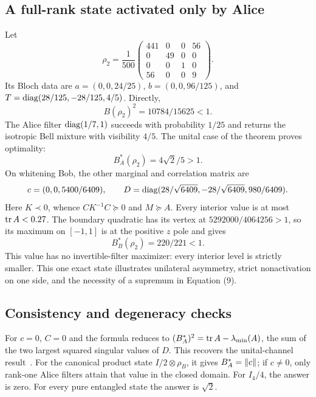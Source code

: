 \subsection{A full-rank state activated only by Alice}
Let
\begin{equation}
 \rho_2=\frac1{500}\begin{pmatrix}
 441&0&0&56\\0&49&0&0\\0&0&1&0\\56&0&0&9
 \end{pmatrix}.
\end{equation}
Its Bloch data are $a=(0,0,24/25)$, $b=(0,0,96/125)$, and
$T=\operatorname{diag}(28/125,-28/125,4/5)$. Directly,
\begin{equation}
 B(\rho_2)^2=10784/15625<1.
\end{equation}
The Alice filter $\operatorname{diag}(1/7,1)$ succeeds with probability $1/25$ and returns the isotropic Bell mixture with visibility $4/5$. The unital case of the theorem proves optimality:
\begin{equation}
 \boxed{B_A^*(\rho_2)=4\sqrt2/5>1.}
\end{equation}
On whitening Bob, the other marginal and correlation matrix are
\begin{equation}
 c=(0,0,5400/6409),\qquad
 D=\operatorname{diag}(28/\sqrt{6409},-28/\sqrt{6409},980/6409).
\end{equation}
Here $K\prec0$, whence $CK^{-1}C\succeq0$ and $M\succeq A$. Every interior value is at most $\operatorname{tr} A<0.27$. The boundary quadratic has its vertex at $5292000/4064256>1$, so its maximum on $[-1,1]$ is at the positive $z$ pole and gives
\begin{equation}
 \boxed{B_B^*(\rho_2)=220/221<1.}
\end{equation}
This value has no invertible-filter maximizer: every interior level is strictly smaller. This one exact state illustrates unilateral asymmetry, strict nonactivation on one side, and the necessity of a supremum in Equation (9).

\subsection{Consistency and degeneracy checks}
For $c=0$, $C=0$ and the formula reduces to
$(B_A^*)^2=\operatorname{tr} A-\lambda_{\min}(A)$, the sum of the two largest squared singular values of $D$. This recovers the unital-channel result~\cite{zhang}. For the canonical product state $I/2\otimes\rho_B$, it gives $B_A^*=\left\lVert c\right\rVert$; if $c\ne0$, only rank-one Alice filters attain that value in the closed domain. For $I_4/4$, the answer is zero. For every pure entangled state the answer is $\sqrt2$.

